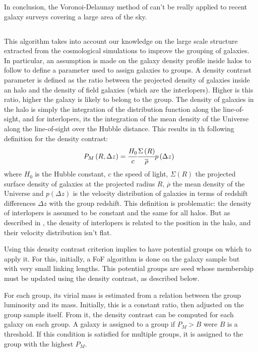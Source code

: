 In conclusion, the Voronoi-Delaunay method of \citet{Marinoni+02} can't be
really applied to recent galaxy surveys covering a large area of the sky.

\subsection{\citet{Yang+07}}
\label{sub:yang07}

This algorithm takes into account our knowledge on the large scale structure
extracted from the cosmological simulations to improve the grouping of
galaxies. In particular, an assumption is made on the galaxy density profile
inside halos to follow \citet{NFW+97} to define a parameter used to assign
galaxies to groups. A density contrast parameter is defined as the ratio
between the projected density of galaxies inside an halo and the density of
field galaxies (which are the interlopers). Higher is this ratio, higher the
galaxy is likely to belong to the group. The density of galaxies in the halo is
simply the integration of the distribution function along the line-of-sight,
and for interlopers, its the integration of the mean density of the Universe
along the line-of-sight over the Hubble distance. This results in th following
definition for the density contrast:
%
\begin{equation}
    P_M \left(R, \Delta z\right)=\cfrac{H_0}{c} \cfrac{\Sigma
    \left(R\right)}{\overline{\rho}} p \left(\Delta z\right)
\end{equation}
%
where $H_0$ is the Hubble constant, $c$ the speed of light,
$\Sigma\left(R\right)$ the projected surface density of galaxies at the
projected radius $R$, $\overline{\rho}$ the mean density of the Universe and $p
\left(\Delta z\right)$ is the velocity distribution of galaxies in terms of
redshift differences $\Delta z$ with the group redshift. This definition is
problematic: the density of interlopers is assumed to be constant and the same
for all halos. But as described in \citet{MBM+10}, the density of interlopers
is related to the position in the halo, and their velocity distribution isn't
flat.

Using this density contrast criterion implies to have potential groups on which
to apply it. For this, initially, a FoF algorithm is done on the galaxy sample
but with very small linking lengths. This potential groups are seed whose
membership must be updated using the density contrast, as described below.

For each group, its virial mass is estimated from a relation between the group
luminosity and its mass. Initially, this is a constant ratio, then adjusted on
the group sample itself. From it, the density contrast can be computed for each
galaxy on each group. A galaxy is assigned to a group if $P_M>B$ were $B$ is a
threshold. If this condition is satisfied for multiple groups, it is assigned
to the group with the highest $P_M$.

